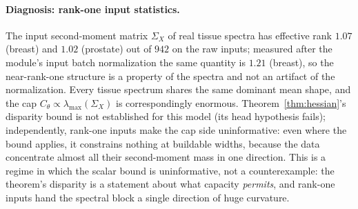 \paragraph{Diagnosis: rank-one input statistics.}
The input second-moment matrix $\Sigma_X$ of real tissue spectra has
effective rank $1.07$ (breast) and $1.02$ (prostate) out of $942$ on
the raw inputs; measured after the module's input batch normalization
the same quantity is $1.21$ (breast), so the near-rank-one structure is
a property of the spectra and not an artifact of the normalization.
Every tissue spectrum shares the same dominant mean shape, and the cap
$C_\theta \propto \lambda_{\max}(\Sigma_X)$ is correspondingly enormous.
Theorem~\ref{thm:hessian}'s disparity bound is not established for this
model (its head hypothesis fails); independently, rank-one inputs make
the cap side uninformative: even where the bound applies, it constrains
nothing at buildable widths, because the data concentrate almost all
their second-moment mass in one direction. This is a regime in which
the scalar bound is uninformative, not a counterexample: the theorem's
disparity is a statement about what capacity \emph{permits}, and
rank-one inputs hand the spectral block a single direction of huge
curvature.

